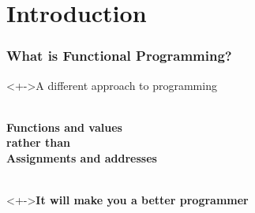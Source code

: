 \documentclass{beamer}
\subtitle{Part I}
\date{Uder, 30.05.2019}
\begin{document}

\begin{frame}
  \titlepage
\end{frame}





\section{Introduction}
\begin{frame}
  \frametitle{What is Functional Programming?}
  \begin{block}<+->{A different approach to programming}
    \begin{LARGE}
      \begin{center}\bf
        ~
        \\[1ex]
        Functions and values
        \\[2ex]
        {\normalsize rather than}
        \\[2ex]
        Assignments and addresses
        \\[1ex]
        ~
      \end{center}
    \end{LARGE}
  \end{block}
  \begin{alertblock}<+->{\bf It will make you a better programmer}
    ~
  \end{alertblock}
\end{frame} 
\end{document}

